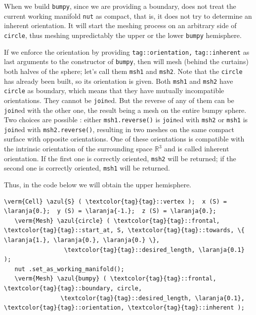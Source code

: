 When we build {\small\tt bumpy}, since we are providing a boundary, {\maniFEM} does not treat
the current working manifold {\small\tt nut} as compact, that is, it does not try to determine an
inherent orientation.
It will start the meshing process on an arbitrary side of {\small\tt circle}, thus meshing
unpredictably the upper or the lower {\small\tt bumpy} hemisphere.

If we enforce the orientation by providing
{\small\tt\textcolor{tag}{tag}::orientation,} {\small\tt\textcolor{tag}{tag}::inherent} as last
arguments to the {\small\tt{}} constructor of {\small\tt bumpy},
then {\maniFEM} will mesh (behind the curtains) both halves of the sphere;
let's call them {\small\tt msh1} and {\small\tt msh2}.
Note that the {\small\tt circle} has already been built, so its orientation is given.
Both {\small\tt msh1} and {\small\tt msh2} have {\small\tt circle} as boundary,
which means that they have mutually incompatible orientations.
They cannot be {\small\tt join}ed.
But the reverse of any of them can be {\small\tt join}ed with the other one, the result being a
mesh on the entire bumpy sphere.
Two choices are possible : either {\small\tt msh1.reverse()} is {\small\tt join}ed with
{\small\tt msh2} or {\small\tt msh1} is {\small\tt join}ed with {\small\tt msh2.reverse()},
resulting in two meshes on the same compact surface with opposite orientations.
One of these orientations is compatible with the intrinsic orientation of the surrounding space
$ \mathbb{R}^3 $ and is called inherent orientation.
If the first one is correctly oriented, {\small\tt msh2} will be returned;
if the second one is correctly oriented, {\small\tt msh1} will be returned.
\vfil\eject

Thus, in the code below we will obtain the upper hemisphere.

\begin{Verbatim}[commandchars=\\\{\},formatcom=\small\tt,
   baselinestretch=0.94,framesep=2mm                      ]
   \verm{Cell} \azul{S} ( \textcolor{tag}{tag}::vertex );  x (S) = \laranja{0.};  y (S) = \laranja{-1.};  z (S) = \laranja{0.};
   \verm{Mesh} \azul{circle} ( \textcolor{tag}{tag}::frontal, \textcolor{tag}{tag}::start_at, S, \textcolor{tag}{tag}::towards, \{ \laranja{1.}, \laranja{0.}, \laranja{0.} \},
                 \textcolor{tag}{tag}::desired_length, \laranja{0.1}                                     );
   nut .set_as_working_manifold();
   \verm{Mesh} \azul{bumpy} ( \textcolor{tag}{tag}::frontal, \textcolor{tag}{tag}::boundary, circle,
                \textcolor{tag}{tag}::desired_length, \laranja{0.1}, \textcolor{tag}{tag}::orientation, \textcolor{tag}{tag}::inherent );
\end{Verbatim}


